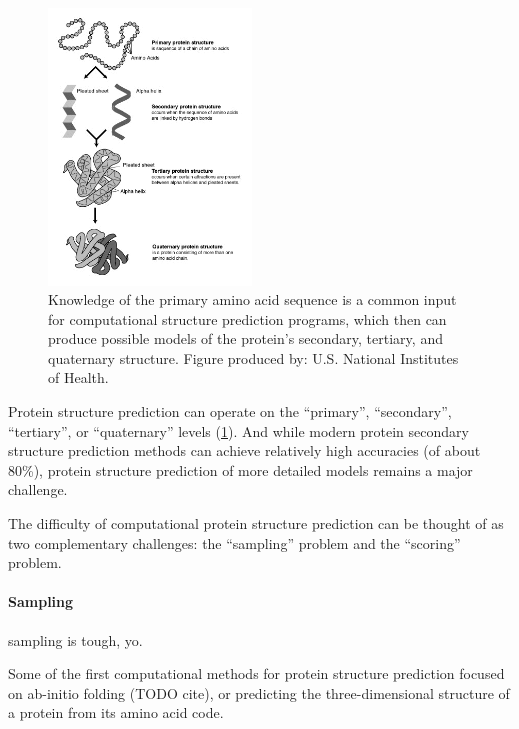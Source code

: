 \begin{figure}
  \centering
  \includegraphics[width=0.48\textwidth,keepaspectratio]{figures/protein-structure.png}
  \caption[Protein sequence/structure]{Knowledge of the primary amino acid sequence is a common input for computational structure prediction programs, which then can produce possible models of the protein's secondary, tertiary, and quaternary structure. Figure produced by: U.S. National Institutes of Health.}
  \label{fig:protein-structure}
  \vspace{-12pt}
\end{figure}

Protein structure prediction can operate on the ``primary'', ``secondary'', ``tertiary'', or ``quaternary'' levels (\cref{fig:protein-structure}).
And while modern protein secondary structure prediction methods can achieve relatively high accuracies (of about 80\%\cite{pirovano_protein_2009}), protein structure prediction of more detailed models remains a major challenge.

The difficulty of computational protein structure prediction can be thought of as two complementary challenges: the ``sampling'' problem and the ``scoring'' problem.

\paragraph{Sampling}
sampling is tough, yo.

Some of the first computational methods for protein structure prediction focused on ab-initio folding (TODO cite), or predicting the three-dimensional structure of a protein from its amino acid code.

